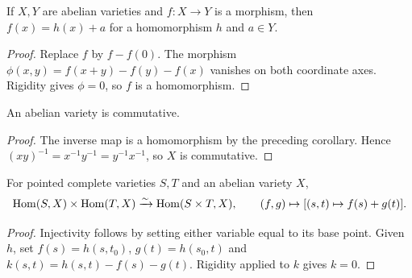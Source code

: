 \begin{corollary}
\label{mumford-cor-morphism-translation}
If $X,Y$ are abelian varieties and $f:X\to Y$ is a morphism, then
$f(x)=h(x)+a$ for a homomorphism $h$ and $a\in Y$.
\leanok
{}
\end{corollary}
\begin{proof}
Replace $f$ by $f-f(0)$. The morphism
$\phi(x,y)=f(x+y)-f(y)-f(x)$ vanishes on both coordinate axes. Rigidity gives
$\phi=0$, so $f$ is a homomorphism.
\end{proof}

\begin{corollary}
\label{mumford-cor-abelian-commutative}
An abelian variety is commutative.
\leanok
{}
\end{corollary}
\begin{proof}
The inverse map is a homomorphism by the preceding corollary. Hence
$(xy)^{-1}=x^{-1}y^{-1}=y^{-1}x^{-1}$, so $X$ is commutative.
\end{proof}

\begin{corollary}
\label{mumford-cor-pointed-hom-linear}
For pointed complete varieties $S,T$ and an abelian variety $X$,
\[
 \operatorname{Hom}(S,X)\times\operatorname{Hom}(T,X)\xrightarrow{\sim}\operatorname{Hom}(S\times T,X),
 \qquad(f,g)\mapsto[(s,t)\mapsto f(s)+g(t)].
\]
\end{corollary}
\begin{proof}
Injectivity follows by setting either variable equal to its base point. Given
$h$, set $f(s)=h(s,t_0)$, $g(t)=h(s_0,t)$ and
$k(s,t)=h(s,t)-f(s)-g(t)$. Rigidity applied to $k$ gives $k=0$.
\end{proof}

